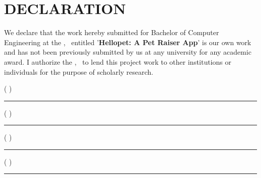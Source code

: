 \section*{DECLARATION}

We declare that the work hereby submitted for Bachelor of Computer Engineering at the \theinstitute, \thecampus\ entitled '\textbf{Hellopet: A Pet Raiser App}' is our own work and has not been previously submitted by
us at any university for any academic award.
I authorize the \theinstitute, \thecampus \ to lend this project work
to other institutions or individuals for the purpose of scholarly research.

\vspace{1cm}
\theauthora ( \rollnoA ) \hspace{2cm}\rule{0.4\textwidth}{0.4pt}
\vspace{0.3cm}

\theauthorb ( \rollnoB )\hspace{1.5cm}\rule{0.4\textwidth}{0.4pt}
\vspace{0.3cm}

\theauthorc ( \rollnoC )\hspace{1.75cm}\rule{0.4\textwidth}{0.4pt}
\vspace{0.3cm}

\theauthord ( \rollnoD )\hspace{2cm}\rule{0.4\textwidth}{0.4pt}\\
\\
\vspace{0.7cm}
\noindent \thedate \\
